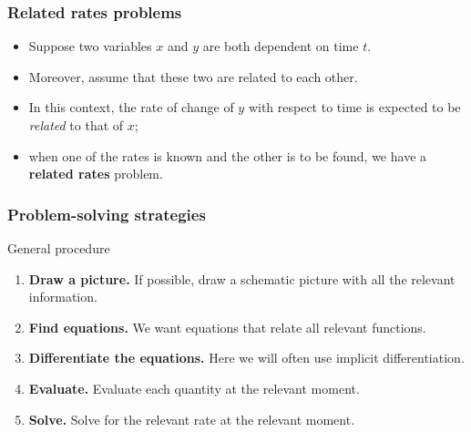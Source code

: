 \documentclass[10pt,t,handout,ignorenonframetext,aspectratio=169]{beamer}
\title[\course]{\lecTitle}
\institute[Ohio State]
{
  \medskip
}
\date[\week]{\semester}
\author{Tae Eun Kim, Ph.D.}
\begin{document}
\begin{frame}
  \titlepage
\end{frame}

\begin{frame}
  \frametitle{Related rates problems}

  \begin{itemize}
  \item<2-> Suppose two variables $x$ and $y$ are both dependent on time
    $t$.
  \item<3-> Moreover, assume that these two are related to each other.
  \item<4-> In this context, the rate of change of $y$ with respect to
    time is expected to be {\it related\/} to that of $x$;
  \item<5-> when one of the rates is known and the other is to be found,
    we have a {\bf related rates} problem.
  \end{itemize}

  \vfill
\end{frame}

\begin{frame}
  \frametitle{Problem-solving strategies}

  \begin{block}{General procedure}
    \vspace{0.1in}
    \begin{enumerate}
    \item<2-> \textbf{Draw a picture.} If possible, draw a schematic
      picture with all the relevant information.
      \vspace{0.1in}
    \item<3-> \textbf{Find equations.} We want equations that relate all
      relevant functions.
      \vspace{0.1in}
    \item<4-> \textbf{Differentiate the equations.} Here we will often use
      implicit differentiation.
      \vspace{0.1in}
    \item<5-> \textbf{Evaluate.} Evaluate each quantity at the relevant
      moment.
      \vspace{0.1in}
    \item<6-> \textbf{Solve.} Solve for the relevant rate at the relevant
      moment.
      \vspace{0.1in}
    \end{enumerate}
  \end{block}

\end{frame}
\end{document}
